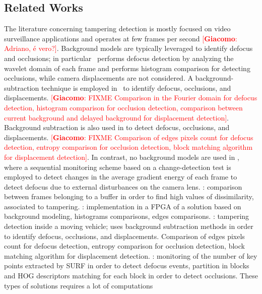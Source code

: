 \documentclass{llncs}
\newcommand{\gi}[1]{{\textcolor{red}{[\small \textbf{Giacomo}: #1]}}}
\begin{document}
\subsection{Related Works}\label{subsec:relWorks}
The literature concerning tampering detection is mostly focused on video surveillance applications and operates at few frames per second \gi{Adriano, \'e vero?}. Background models are typically leveraged to identify defocus and occlusions; in particular~\cite{aksay2007camera} performs defocus detection by analyzing the wavelet domain of each frame and performs histogram comparison for detecting occlusions, while camera displacements are not considered. A background-subtraction technique is employed in~\cite{saglam2009real} to identify defocus, occlusions, and displacements. \gi{FIXME Comparison in the Fourier domain for defocus detection, histogram comparison for occlusion detection, comparison between current background and delayed background for displacement detection}. Background subtraction is also used in \cite{gil2007automatic} to detect defocus, occlusions, and displacements. \gi{FIXME Comparison of edges pixels count for defocus detection, entropy comparison for occlusion detection, block matching algorithm for displacement detection}.
In contrast, no background models are used in \cite{alippi2010detecting}, where a sequential monitoring scheme based on a change-detection test is employed to detect changes in the average gradient energy of each frame to detect defocus due to external disturbances on the camera lens.  
\cite{ribnick2006real}: comparison between frames belonging to a buffer in order to find high values of dissimilarity, associated to tampering.
\cite{kryjak2012fpga}: implementation in a FPGA of a solution based on background modeling, histograms comparisons, edges comparisons.
\cite{harasse2004automated}: tampering detection inside a moving vehicle; uses background subtraction methods in order to identify defocus, occlusions, and displacements. Comparison of edges pixels count for defocus detection, entropy comparison for occlusion detection, block matching algorithm for displacement detection.
\cite{tsesmelis2013tamper}: monitoring of the number of key points extracted by SURF in order to detect defocus events, partition in blocks and HOG descriptors matching for each block in order to detect occlusions. These types of solutions requires a lot of computations
%
%
%
\end{document}
